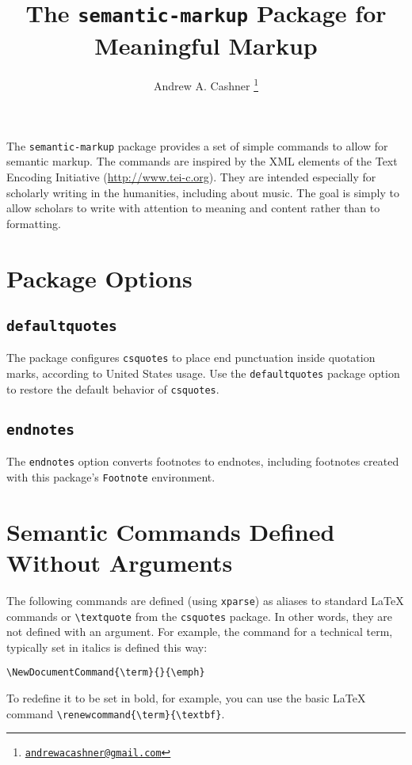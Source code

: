 \documentclass{article}
\title{The \texttt{semantic-markup} Package for Meaningful Markup}
\author{Andrew A. Cashner%
  \thanks{\href{mailto:andrewacashner@gmail.com}{\nolinkurl{andrewacashner@gmail.com}}}%
}
\begin{document}
\maketitle

The \texttt{semantic-markup} package provides a set of simple commands to allow for semantic markup.
The commands are inspired by the XML elements of the Text Encoding Initiative (\url{http://www.tei-c.org}).
They are intended especially for scholarly writing in the humanities, including about music.
The goal is simply to allow scholars to write with attention to meaning and content rather than to formatting.

\tableofcontents

\section{Package Options}

\subsection{\texttt{defaultquotes}}

The package configures \texttt{csquotes} to place end punctuation inside quotation marks, according to United States usage. 
Use the \texttt{defaultquotes} package option to restore the default behavior of \texttt{csquotes}.

\subsection{\texttt{endnotes}}

The \texttt{endnotes} option converts footnotes to endnotes, including footnotes created with this package's \texttt{Footnote} environment.

\section{Semantic Commands Defined Without Arguments}

The following commands are defined (using \texttt{xparse}) as aliases to standard \LaTeX{} commands or \verb|\textquote| from the \texttt{csquotes} package.
In other words, they are not defined with an argument.
For example, the command for a technical term, typically set in italics is defined this way: 
\begin{verbatim}
\NewDocumentCommand{\term}{}{\emph}
\end{verbatim}
To redefine it to be set in bold, for example, you can use the basic \LaTeX{} command \verb|\renewcommand{\term}{\textbf}|.
\end{document}
